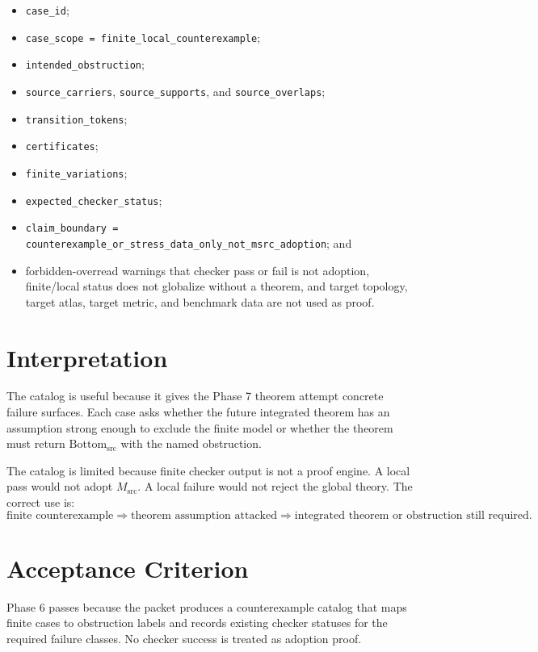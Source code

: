 \documentclass[11pt]{article}
\newcommand{\Msrc}{M_{\mathrm{src}}}
\newcommand{\Bottomsrc}{\mathrm{Bottom}_{\mathrm{src}}}
\begin{document}
\begin{itemize}
  \item \texttt{case\_id};
  \item \texttt{case\_scope = finite\_local\_counterexample};
  \item \texttt{intended\_obstruction};
  \item \texttt{source\_carriers}, \texttt{source\_supports}, and
        \texttt{source\_overlaps};
  \item \texttt{transition\_tokens};
  \item \texttt{certificates};
  \item \texttt{finite\_variations};
  \item \texttt{expected\_checker\_status};
  \item \texttt{claim\_boundary =
        counterexample\_or\_stress\_data\_only\_not\_msrc\_adoption}; and
  \item forbidden-overread warnings that checker pass or fail is not adoption,
        finite/local status does not globalize without a theorem, and target
        topology, target atlas, target metric, and benchmark data are not used
        as proof.
\end{itemize}

\section{Interpretation}

The catalog is useful because it gives the Phase 7 theorem attempt concrete
failure surfaces. Each case asks whether the future integrated theorem has an
assumption strong enough to exclude the finite model or whether the theorem
must return \(\Bottomsrc\) with the named obstruction.

The catalog is limited because finite checker output is not a proof engine.
A local pass would not adopt \(\Msrc\). A local failure would not reject the
global theory. The correct use is:
\[
  \text{finite counterexample}
  \Longrightarrow
  \text{theorem assumption attacked}
  \Longrightarrow
  \text{integrated theorem or obstruction still required}.
\]

\section{Acceptance Criterion}

Phase 6 passes because the packet produces a counterexample catalog that maps
finite cases to obstruction labels and records existing checker statuses for
the required failure classes. No checker success is treated as adoption proof.
\end{document}
